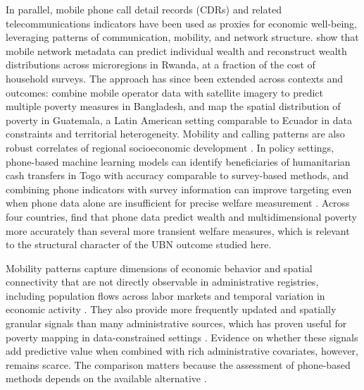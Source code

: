 \documentclass[pdflatex,sn-apa]{sn-jnl}
\begin{document}
In parallel, mobile phone call detail records (CDRs) and related telecommunications indicators have been used as proxies for economic well-being, leveraging patterns of communication, mobility, and network structure. \citet{blumenstock2015predicting} show that mobile network metadata can predict individual wealth and reconstruct wealth distributions across microregions in Rwanda, at a fraction of the cost of household surveys. The approach has since been extended across contexts and outcomes: \citet{steele2017mapping} combine mobile operator data with satellite imagery to predict multiple poverty measures in Bangladesh, and \citet{hernandez2017estimating} map the spatial distribution of poverty in Guatemala, a Latin American setting comparable to Ecuador in data constraints and territorial heterogeneity. Mobility and calling patterns are also robust correlates of regional socioeconomic development \citep{scepanovic2015mobile}. In policy settings, phone-based machine learning models can identify beneficiaries of humanitarian cash transfers in Togo with accuracy comparable to survey-based methods, and combining phone indicators with survey information can improve targeting even when phone data alone are insufficient for precise welfare measurement \citep{aiken2022machine, aiken2023targeting}. Across four countries, \citet{Smith2026Wellbeing} find that phone data predict wealth and multidimensional poverty more accurately than several more transient welfare measures, which is relevant to the structural character of the UBN outcome studied here.

Mobility patterns capture dimensions of economic behavior and spatial connectivity that are not directly observable in administrative registries, including population flows across labor markets and temporal variation in economic activity \citep{scepanovic2015mobile}. They also provide more frequently updated and spatially granular signals than many administrative sources, which has proven useful for poverty mapping in data-constrained settings \citep{blumenstock2015predicting, hernandez2017estimating}. Evidence on whether these signals add predictive value when combined with rich administrative covariates, however, remains scarce. The comparison matters because the assessment of phone-based methods depends on the available alternative \citep{aiken2022machine}.
\end{document}
